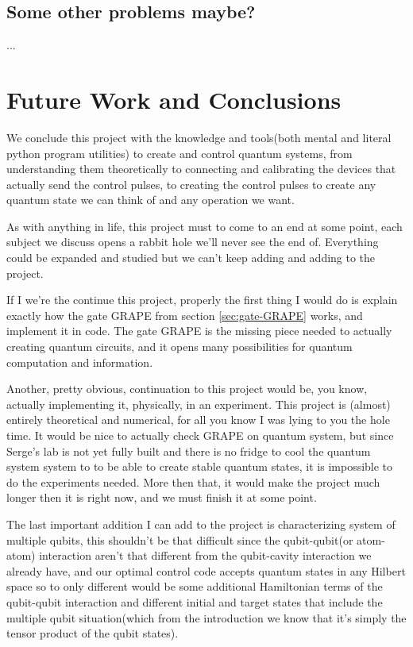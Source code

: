 \documentclass[english, a4paper, 12pt, twoside]{article}
\numberwithin{equation}{section} %
\begin{document}
\subsection{Some other problems maybe?}
...

\newpage
\section{Future Work and Conclusions}
We conclude this project with the knowledge and tools(both mental and literal python program utilities) to create and control quantum systems, from understanding them theoretically to connecting and calibrating the devices that actually send the control pulses, to creating the control pulses to create any quantum state we can think of and any operation we want.

As with anything in life, this project must to come to an end at some point, each subject we discuss opens a rabbit hole we'll never see the end of. Everything could be expanded and studied but we can't keep adding and adding to the project.

If I we're the continue this project, properly the first thing I would do is explain exactly how the gate GRAPE from section \ref{sec:gate-GRAPE} works, and implement it in code. The gate GRAPE is the missing piece needed to actually creating quantum circuits, and it opens many possibilities for quantum computation and information.

Another, pretty obvious, continuation to this project would be, you know, actually implementing it, physically, in an experiment. This project is (almost) entirely theoretical and numerical, for all you know I was lying to you the hole time. It would be nice to actually check GRAPE on quantum system, but since Serge's lab is not yet fully built and there is no fridge to cool the quantum system system to to be able to create stable quantum states, it is impossible to do the experiments needed. More then that, it would make the project much longer then it is right now, and we must finish it at some point.

 The last important addition I can add to the project is characterizing system of multiple qubits, this shouldn't be that difficult since the qubit-qubit(or atom-atom) interaction aren't that different from the qubit-cavity interaction we already have, and our optimal control code accepts quantum states in any Hilbert space so to only different would be some additional Hamiltonian terms of the qubit-qubit interaction and different initial and target states that include the multiple qubit situation(which from the introduction we know that it's simply the tensor product of the qubit states).
\end{document}
